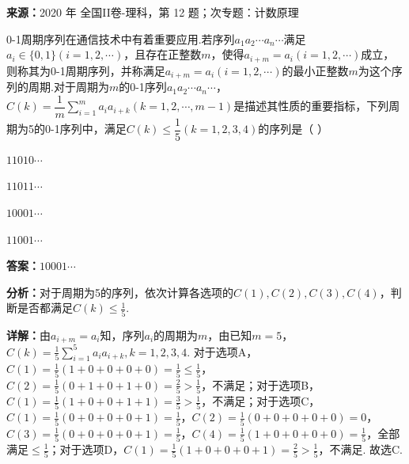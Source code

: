 \begin{question}[points=5]
\textbf{来源：}2020 年 全国II卷-理科，第 12 题；次专题：计数原理\par
0-1周期序列在通信技术中有着重要应用.若序列$a_1a_2\cdots a_n\cdots$满足$a_i\in\{0,1\}(i=1,2,\cdots)$，且存在正整数$m$，使得$a_{i+m}=a_i(i=1,2,\cdots)$成立，则称其为0-1周期序列，并称满足$a_{i+m}=a_i(i=1,2,\cdots)$的最小正整数$m$为这个序列的周期.对于周期为$m$的0-1序列$a_1a_2\cdots a_n\cdots$，$C(k)=\dfrac1m\sum\limits_{i=1}^m a_i a_{i+k}(k=1,2,\cdots,m-1)$是描述其性质的重要指标，下列周期为5的0-1序列中，满足$C(k)\le\dfrac15(k=1,2,3,4)$的序列是（ ）
\begin{choices}
  \item $11010\cdots$
  \item $11011\cdots$
  \item $10001\cdots$
  \item $11001\cdots$
\end{choices}
\begin{solution}
\textbf{答案：}$10001\cdots$

\textbf{分析：}对于周期为5的序列，依次计算各选项的$C(1),C(2),C(3),C(4)$，判断是否都满足$C(k)\le\frac15$.

\textbf{详解：}由$a_{i+m}=a_i$知，序列$a_i$的周期为$m$，由已知$m=5$，$C(k)=\frac15\sum_{i=1}^5 a_i a_{i+k},k=1,2,3,4$. 对于选项A，$C(1)=\frac15(1+0+0+0+0)=\frac15\le\frac15$，$C(2)=\frac15(0+1+0+1+0)=\frac25>\frac15$，不满足；对于选项B，$C(1)=\frac15(1+0+0+1+1)=\frac35>\frac15$，不满足；对于选项C，$C(1)=\frac15(0+0+0+0+1)=\frac15$，$C(2)=\frac15(0+0+0+0+0)=0$，$C(3)=\frac15(0+0+0+0+1)=\frac15$，$C(4)=\frac15(1+0+0+0+0)=\frac15$，全部满足$\le\frac15$；对于选项D，$C(1)=\frac15(1+0+0+0+1)=\frac25>\frac15$，不满足. 故选C.
\end{solution}
\end{question}

